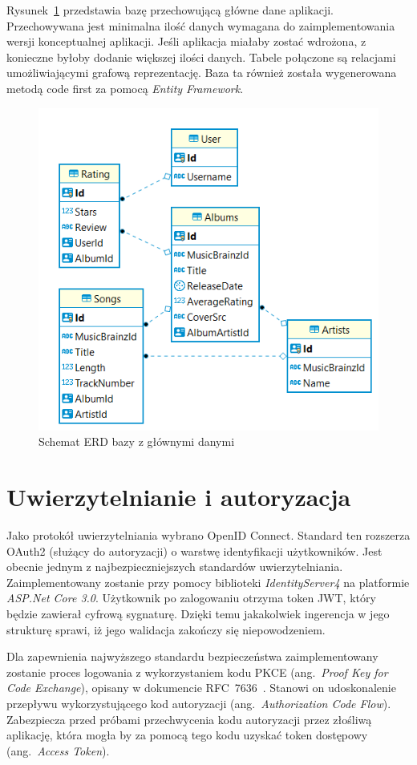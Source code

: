 	Rysunek~\ref{fig:erdRe} przedstawia bazę przechowującą główne dane aplikacji.
	Przechowywana jest minimalna ilość danych wymagana do zaimplementowania wersji konceptualnej aplikacji.
	Jeśli aplikacja miałaby zostać wdrożona, z konieczne byłoby dodanie większej ilości danych.
	Tabele połączone są relacjami umożliwiającymi grafową reprezentację.
	Baza ta również została wygenerowana metodą code first za pomocą \emph{Entity Framework}.

	\begin{figure}[ht]
		\centering
			\includegraphics[width=0.5\linewidth]{rys03/erdRe.png}
		 \caption{Schemat ERD bazy z głównymi danymi}
		 \label{fig:erdRe}
	\end{figure}

\section{Uwierzytelnianie i autoryzacja}\label{sec:openid}
	Jako protokół uwierzytelniania wybrano OpenID Connect.
	Standard ten rozszerza OAuth2 (służący do autoryzacji) o warstwę identyfikacji użytkowników.
	Jest obecnie jednym z najbezpieczniejszych standardów uwierzytelniania.
	Zaimplementowany zostanie przy pomocy biblioteki \emph{IdentityServer4} na platformie \emph{ASP.Net Core 3.0}.
	Użytkownik po zalogowaniu otrzyma token JWT, który będzie zawierał cyfrową sygnaturę.
	Dzięki temu jakakolwiek ingerencja w jego strukturę sprawi, iż jego walidacja zakończy się niepowodzeniem.

	Dla zapewnienia najwyższego standardu bezpieczeństwa zaimplementowany zostanie proces logowania z wykorzystaniem kodu PKCE (ang.\ \emph{Proof Key for Code Exchange}),
	opisany w dokumencie RFC~7636~\cite{PKCE}.
	Stanowi on udoskonalenie przepływu wykorzystującego kod autoryzacji (ang.\ \emph{Authorization Code Flow}).
	Zabezpiecza przed próbami przechwycenia kodu autoryzacji przez złośliwą aplikację,
	która mogła by za pomocą tego kodu uzyskać token dostępowy (ang.\ \emph{Access Token}).
	
